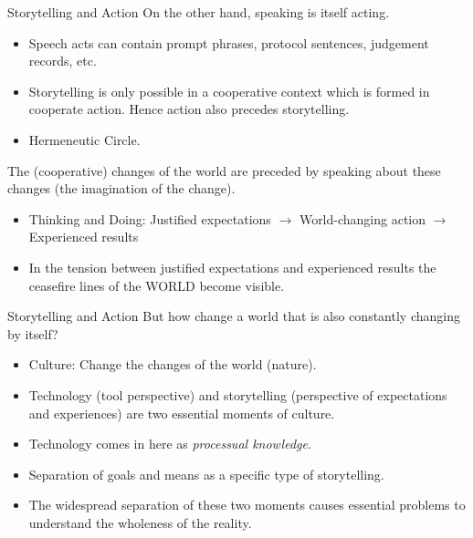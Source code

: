 \documentclass{beamer}
\begin{document}
\begin{frame}{Storytelling and Action}
On the other hand, speaking is itself acting.
\begin{itemize}
\item Speech acts can contain prompt phrases, protocol sentences, judgement
  records, etc.
\item Storytelling is only possible in a cooperative context which is formed
  in cooperate action. Hence action also precedes storytelling.
\item Hermeneutic Circle.
\end{itemize}
The (cooperative) changes of the world are preceded by speaking about these
changes (the imagination of the change).
\begin{itemize}
\item Thinking and Doing: Justified expectations $\to$ World-changing action
  $\to$ Experienced results
\item In the tension between justified expectations and experienced results
  the ceasefire lines of the WORLD become visible.
\end{itemize}
\end{frame}
\begin{frame}{Storytelling and Action}
But how change a world that is also constantly changing by itself?
\begin{itemize}
\item Culture: Change the changes of the world (nature).
\item Technology (tool perspective) and storytelling (perspective of
  expectations and experiences) are two essential moments of culture.
\item Technology comes in here as \emph{processual knowledge}. 
\item Separation of goals and means as a specific type of storytelling.
\item The widespread separation of these two moments causes essential problems
  to understand the wholeness of the reality.
\end{itemize}
\end{frame}
\end{document}
